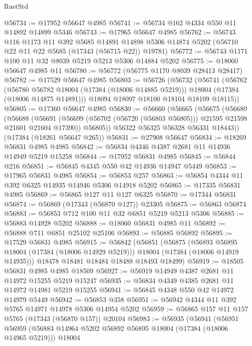 \begin{lexlean}{RustStd}
\begin{coremodule}
@56734 := @17952 @56647 @4985
@56741 := @56734 @162 @4334 @550 @11 @14892 @14899 @5346
@56743 := @17965 @56647 @4985
@56762 := @56743
    @116
    @1173
    @11
    @392
    @5685
    @14891
    @14898
    @5306
    @14874
    @5202
    (@56710 @22 @11 @22 @5685 (@17343 (@56715 @22)) @19781)
@56772 := @56743 @1171 @100 @11 @32 @8039 @5219 @5213 @5306 @14884 @5202
@56775 := @18060 @56647 @4985 @11
@56780 := @56772 (@56775 @1170 @8039 @28413 @28417)
@56782 := @17529 @56647 @4985
@56803 := @56726
    (@56732
      (@56741
        (@56762
          (@56780 @56782 @18004 (@17384 (@18006 @14885 @5219)))
          @18004
          (@17384 (@18006 @14875 @14891)))
        @18094
        @18097
        @18100
        @18104
        @18109
        @18115))
@56805 := @17360 @56647 @4985
@56830 := @56660
    (@56665
      (@56675
        (@56680
          (@56688
            (@56691 (@56699 (@56702 (@56720 (@56803 @56805))) @21595 @21598 @21601 @21604 @17390))
            @56805))
        @56322
        @56325
        @56328
        @56331
        @18443))
    (@17384 (@18261 @56647 @265))
@56831 := @27908 @56647
@56834 := @18269 @56831 @4985 @4985
@56842 := @56834 @4346 @4387 @2681 @11 @14936 @14949 @5219 @15258
@56844 := @17952 @56831 @4985
@56845 := @56844 @216
@56851 := @56845 @4345 @550 @42 @14936 @14947 @5449
@56853 := @17965 @56831 @4985
@56854 := @56853 @257
@56863 := @56854 @4344 @11 @392 @6325 @14935 @14946 @5306 @14918 @5202
@56865 := @17335 @56831 @4985
@56869 := @56865 @127 @11 @127 @6325
@56870 := @17344 @56831
@56874 := @56869 (@17343 (@56870 @127)) @23305
@56875 := @56863 @56874
@56883 := @56853 @712 @100 @11 @32 @6851 @5219 @5213 @5306
@56885 := @56883 @14928 @5202
@56888 := @18060 @56831 @4985 @11
@56892 := @56888 @711 @6851 @25102 @25106
@56893 := @56885 @56892
@56895 := @17529 @56831 @4985
@56915 := @56842
    (@56851
      (@56875
        (@56893 @56895 @18004 (@17384 (@18006 @14929 @5219)))
        @18004
        (@17384 (@18006 @14919 @14935)))
      @18478
      @18481
      @18484
      @18488
      @18493
      @18499)
@56919 := @18505 @56831 @4985 @4985 @18509
@56927 := @56919 @14949 @4387 @2681 @11 @14972 @15255 @5219 @15247
@56935 := @56834 @4349 @4385 @2681 @11 @14972 @14981 @5219 @15255
@56941 := @56845 @4348 @550 @42 @14972 @14979 @5449
@56942 := @56853 @358
@56951 := @56942 @4344 @11 @392 @5765 @14971 @14978 @5306 @14954 @5202
@56959 := @56865 @157 @11 @157 @5765 (@17343 (@56870 @157)) @20104
@56983 := @56935
    (@56941
      (@56951
        @56959
        (@56883 @14964 @5202 @56892 @56895 @18004 (@17384 (@18006 @14965 @5219)))
        @18004

\end{coremodule}
\end{lexlean}
